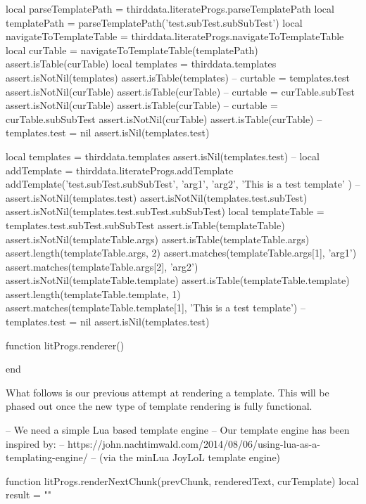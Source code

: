 {{
\startLuaTest
local parseTemplatePath = thirddata.literateProgs.parseTemplatePath
local templatePath = parseTemplatePath('test.subTest.subSubTest')
local navigateToTemplateTable = thirddata.literateProgs.navigateToTemplateTable
local curTable = navigateToTemplateTable(templatePath)
assert.isTable(curTable)
local templates = thirddata.templates
assert.isNotNil(templates)
assert.isTable(templates)
--
curtable = templates.test
assert.isNotNil(curTable)
assert.isTable(curTable)
--
curtable = curTable.subTest
assert.isNotNil(curTable)
assert.isTable(curTable)
--
curtable = curTable.subSubTest
assert.isNotNil(curTable)
assert.isTable(curTable)
--
templates.test = nil
assert.isNil(templates.test)
\stopLuaTest
\stopTestCase

\startLuaTest
local templates = thirddata.templates
assert.isNil(templates.test)
--
local addTemplate = thirddata.literateProgs.addTemplate
addTemplate('test.subTest.subSubTest',
  { 'arg1', 'arg2'},
  'This is a test template'
)
--
assert.isNotNil(templates.test)
assert.isNotNil(templates.test.subTest)
assert.isNotNil(templates.test.subTest.subSubTest)
local templateTable = templates.test.subTest.subSubTest
assert.isTable(templateTable)
assert.isNotNil(templateTable.args)
assert.isTable(templateTable.args)
assert.length(templateTable.args, 2)
assert.matches(templateTable.args[1], 'arg1')
assert.matches(templateTable.args[2], 'arg2')
assert.isNotNil(templateTable.template)
assert.isTable(templateTable.template)
assert.length(templateTable.template, 1)
assert.matches(templateTable.template[1], 'This is a test template')
--
templates.test = nil
assert.isNil(templates.test)
\stopLuaTest
\stopTestCase

\stopTestSuite

\startLuaCode
function litProgs.renderer()

end
\stopLuaCode

What follows is our previous attempt at rendering a template. This will be 
phased out once the new type of template rendering is fully functional. 

\startLuaCode

-- We need a simple Lua based template engine
-- Our template engine has been inspired by:
--   https://john.nachtimwald.com/2014/08/06/using-lua-as-a-templating-engine/
-- (via the minLua JoyLoL template engine)

function litProgs.renderNextChunk(prevChunk, renderedText, curTemplate)
  local result = ""
  
}}
